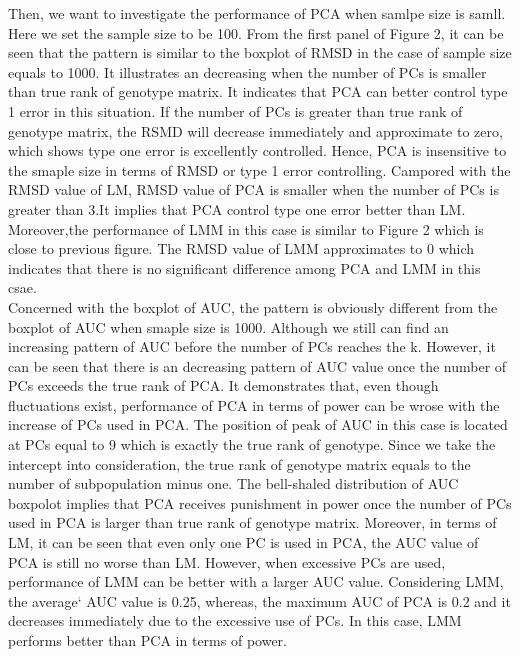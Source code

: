 \documentclass[12pt]{article}
\begin{document}
Then, we want to investigate the performance of PCA when samlpe size is samll. Here we set the sample size to be 100. From the first panel of Figure 2, it can be seen that the pattern is similar to the boxplot of RMSD in the case of sample size equals to 1000. It illustrates an decreasing when the number of PCs is smaller than true rank of genotype matrix. It indicates that PCA can better control type 1 error in this situation. If the number of PCs is greater than true rank of genotype matrix, the RSMD will decrease immediately and approximate to zero, which shows type one error is excellently controlled. Hence, PCA is insensitive to the smaple size in terms of RMSD or type 1 error controlling. Campored with the RMSD value of LM, RMSD value of PCA is smaller when the number of PCs is greater than 3.It implies that PCA control type one error better than LM. Moreover,the performance of LMM in this case is similar to Figure 2 which is close to previous figure. The RMSD value of LMM approximates to 0 which indicates that there is no significant difference among PCA and LMM in this csae.\\

Concerned with the boxplot of AUC, the pattern is obviously different from the boxplot of AUC when smaple size is 1000. Although we still can find an increasing pattern of AUC before the number of PCs reaches the k. However, it can be seen that there is an decreasing pattern of AUC value once the number of PCs exceeds the true rank of PCA. It demonstrates that, even though fluctuations exist, performance of PCA in terms of power can be wrose with the increase of PCs used in PCA. The position of peak of AUC in this case is located at PCs equal to 9 which is exactly the true rank of genotype. Since we take the intercept into consideration, the true rank of genotype matrix equals to the number of subpopulation minus one. The bell-shaled distribution of AUC boxpolot implies that PCA receives punishment in power once the number of PCs used in PCA is larger than true rank of genotype matrix. Moreover, in terms of LM, it can be seen that even only one PC is used in PCA, the AUC value of PCA is still no worse than LM. However, when  excessive PCs are used, performance of LMM can be better with a larger AUC value. Considering LMM, the average` AUC value is 0.25, whereas, the maximum AUC of PCA is 0.2 and it decreases immediately due to the excessive use of PCs. In this case, LMM performs better than PCA in terms of power. \\
\end{document}
